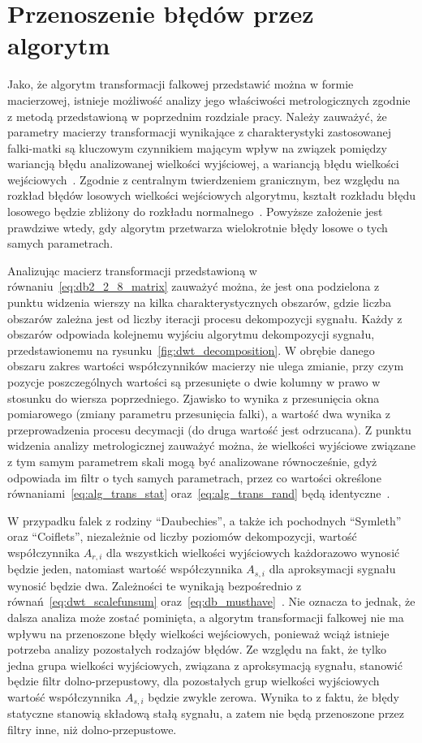 \section{Przenoszenie błędów przez algorytm}

Jako, że algorytm transformacji falkowej przedstawić można w formie macierzowej, istnieje możliwość analizy jego właściwości metrologicznych zgodnie z metodą przedstawioną w poprzednim rozdziale pracy. Należy zauważyć, że parametry macierzy transformacji wynikające z charakterystyki zastosowanej falki-matki są kluczowym czynnikiem mającym wpływ na związek pomiędzy wariancją błędu analizowanej wielkości wyjściowej, a wariancją błędu wielkości wejściowych~\cite{auth_electronics}. Zgodnie z centralnym twierdzeniem granicznym, bez względu na rozkład błędów losowych wielkości wejściowych algorytmu, kształt rozkładu błędu losowego będzie zbliżony do rozkładu normalnego~\cite{jcgm_guide}. Powyższe założenie jest prawdziwe wtedy, gdy algorytm przetwarza wielokrotnie błędy losowe o tych samych parametrach.

Analizując macierz transformacji przedstawioną w równaniu~\eqref{eq:db2_2_8_matrix} zauważyć można, że jest ona podzielona z punktu widzenia wierszy na kilka charakterystycznych obszarów, gdzie liczba obszarów zależna jest od liczby iteracji procesu dekompozycji sygnału. Każdy z obszarów odpowiada kolejnemu wyjściu algorytmu dekompozycji sygnału, przedstawionemu na rysunku~\ref{fig:dwt_decomposition}. W obrębie danego obszaru zakres wartości współczynników macierzy nie ulega zmianie, przy czym pozycje poszczególnych wartości są przesunięte o dwie kolumny w prawo w stosunku do wiersza poprzedniego. Zjawisko to wynika z przesunięcia okna pomiarowego (zmiany parametru przesunięcia falki), a wartość dwa wynika z przeprowadzenia procesu decymacji (do druga wartość jest odrzucana). Z punktu widzenia analizy metrologicznej zauważyć można, że wielkości wyjściowe związane z tym samym parametrem skali mogą być analizowane równocześnie, gdyż odpowiada im filtr o tych samych parametrach, przez co wartości określone równaniami~\eqref{eq:alg_trans_stat} oraz~\eqref{eq:alg_trans_rand} będą identyczne~\cite{auth_electronics}.

W przypadku falek z rodziny \enquote{Daubechies}, a także ich pochodnych \enquote{Symleth} oraz \enquote{Coiflets}, niezależnie od liczby poziomów dekompozycji, wartość współczynnika $A_{r,i}$ dla wszystkich wielkości wyjściowych każdorazowo wynosić będzie jeden, natomiast wartość współczynnika $A_{s,i}$ dla aproksymacji sygnału wynosić będzie dwa. Zależności te wynikają bezpośrednio z równań~\eqref{eq:dwt_scalefunsum} oraz~\eqref{eq:db_musthave}~\cite{vonesch_dbbasics, wei_coiflet}. Nie oznacza to jednak, że dalsza analiza może zostać pominięta, a algorytm transformacji falkowej nie ma wpływu na przenoszone błędy wielkości wejściowych, ponieważ wciąż istnieje potrzeba analizy pozostałych rodzajów błędów. Ze względu na fakt, że tylko jedna grupa wielkości wyjściowych, związana z aproksymacją sygnału, stanowić będzie filtr dolno-przepustowy, dla pozostałych grup wielkości wyjściowych wartość współczynnika $A_{s,i}$ będzie zwykle zerowa. Wynika to z faktu, że błędy statyczne stanowią składową stałą sygnału, a zatem nie będą przenoszone przez filtry inne, niż dolno-przepustowe.

